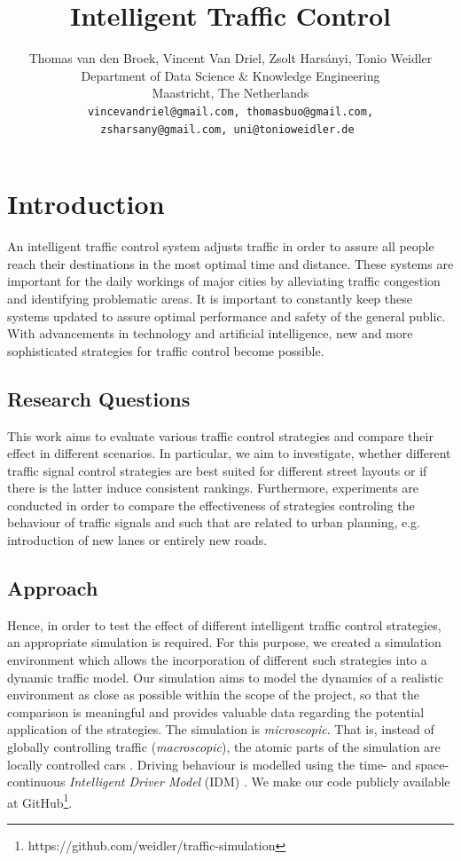 \documentclass[11pt]{article}
\title{Intelligent Traffic Control}
\author{Thomas van den Broek, Vincent Van Driel, Zsolt Harsányi, Tonio Weidler\\
	Department of Data Science \& Knowledge Engineering\\
	Maastricht, The Netherlands\\
	\tt \small vincevandriel@gmail.com, thomasbuo@gmail.com,\\
	\tt \small zsharsany@gmail.com, uni@tonioweidler.de
}
\begin{document}
\maketitle
\begin{abstract}
\end{abstract}

\section{Introduction}
An intelligent traffic control system adjusts traffic in order to assure all people reach their destinations in the most optimal time and distance. These systems are important for the daily workings of major cities by alleviating traffic congestion and identifying problematic areas. It is important to constantly keep these systems updated to assure optimal performance and safety of the general public. With advancements in technology and artificial intelligence, new and more sophisticated strategies for traffic control become possible.

\subsection{Research Questions}
This work aims to evaluate various traffic control strategies and compare their effect in different scenarios. In particular, we aim to investigate, whether different traffic signal control strategies are best suited for different street layouts or if there is the latter induce consistent rankings. Furthermore, experiments are conducted in order to compare the effectiveness of strategies controling the behaviour of traffic signals and such that are related to urban planning, e.g. introduction of new lanes or entirely new roads.

\subsection{Approach}
Hence, in order to test the effect of different intelligent traffic control strategies, an appropriate simulation is required. For this purpose, we created a simulation environment which allows the incorporation of different such strategies into a dynamic traffic model. Our simulation aims to model the dynamics of a realistic environment as close as possible within the scope of the project, so that the comparison is meaningful and provides valuable data regarding the potential application of the strategies. The simulation is \textit{microscopic}. That is, instead of globally controlling traffic (\textit{macroscopic}), the atomic parts of the simulation are locally controlled cars \citep[see also][]{krajzewicz2002sumo}. Driving behaviour is modelled using the time- and space-continuous \textit{Intelligent Driver Model} (IDM) \citep{treiber2000congested}. We make our code publicly available at GitHub\footnote{https://github.com/weidler/traffic-simulation}.
\end{document}
